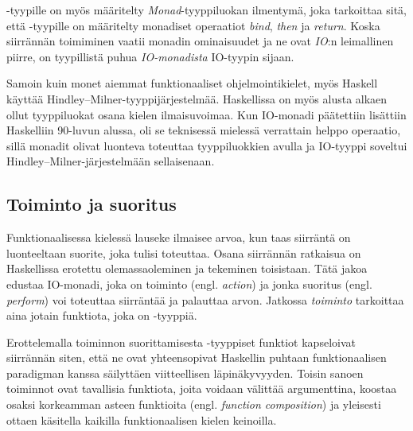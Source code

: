 \documentclass[finnish]{tktltiki2}
\begin{document}
-tyypille on myös määritelty \emph{Monad}-tyyppiluokan ilmentymä, joka tarkoittaa sitä,
että -tyypille on määritelty monadiset operaatiot \emph{bind}, \emph{then} ja
\emph{return}. Koska siirrännän toimiminen vaatii monadin ominaisuudet ja ne ovat \emph{IO}:n
leimallinen piirre, on tyypillistä puhua \emph{IO-monadista} IO-tyypin sijaan.

Samoin kuin monet aiemmat funktionaaliset ohjelmointikielet, myös Haskell käyttää
Hindley--Milner-tyyppijärjestelmää. Haskellissa on myös alusta alkaen ollut tyyppiluokat osana
kielen ilmaisuvoimaa. Kun IO-monadi päätettiin lisättiin Haskelliin 90-luvun alussa, oli se
teknisessä mielessä verrattain helppo operaatio, sillä monadit olivat luonteva toteuttaa
tyyppiluokkien avulla ja IO-tyyppi soveltui Hindley--Milner-järjestelmään sellaisenaan.

\subsection{Toiminto ja suoritus}

Funktionaalisessa kielessä lauseke ilmaisee arvoa, kun taas siirräntä on luonteeltaan suorite, joka
tulisi toteuttaa. Osana siirrännän ratkaisua on Haskellissa erotettu olemassaoleminen ja tekeminen
toisistaan. Tätä jakoa edustaa IO-monadi, joka on toiminto (engl. \emph{action}) ja jonka suoritus
(engl. \emph{perform}) voi toteuttaa siirräntää ja palauttaa arvon. Jatkossa \emph{toiminto}
tarkoittaa aina jotain funktiota, joka on -tyyppiä.

Erottelemalla toiminnon suorittamisesta -tyyppiset funktiot kapseloivat siirrännän siten,
että ne ovat yhteensopivat Haskellin puhtaan funktionaalisen paradigman kanssa säilyttäen
viitteellisen läpinäkyvyyden. Toisin sanoen toiminnot ovat tavallisia funktiota, joita voidaan
välittää argumenttina, koostaa osaksi korkeamman asteen funktioita (engl. \emph{function
composition}) ja yleisesti ottaen käsitella kaikilla funktionaalisen kielen keinoilla.

\end{document}
